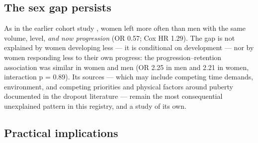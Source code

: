 \documentclass[12pt,a4paper]{article}
\begin{document}
\subsection{The sex gap persists}\label{sec:sex}

As in the earlier cohort study \citep{guttormsen2026dropout}, women left more often than men with the same volume, level, \emph{and now progression} (OR 0.57; Cox HR 1.29). The gap is not explained by women developing less --- it is conditional on development --- nor by women responding less to their own progress: the progression--retention association was similar in women and men (OR 2.25 in men and 2.21 in women, interaction p = 0.89). Its sources --- which may include competing time demands, environment, and competing priorities and physical factors around puberty documented in the dropout literature \citep{crane2015,fraserthomas2008} --- remain the most consequential unexplained pattern in this registry, and a study of its own.

\subsection{Practical implications}
\end{document}
